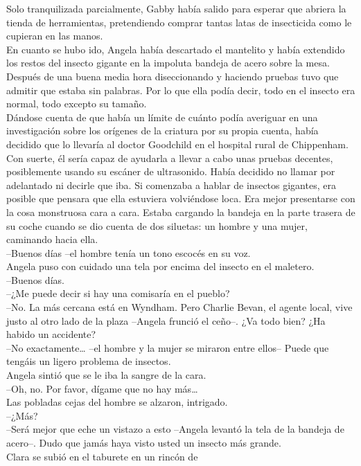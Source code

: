Solo tranquilizada parcialmente, Gabby había salido para esperar que
abriera la tienda de herramientas, pretendiendo comprar tantas latas de
insecticida como le cupieran en las manos.\\
En cuanto se hubo ido, Angela había descartado el mantelito y había
extendido los restos del insecto gigante en la impoluta bandeja de acero
sobre la mesa. Después de una buena media hora diseccionando y haciendo
pruebas tuvo que admitir que estaba sin palabras. Por lo que ella podía
decir, todo en el insecto era normal, todo excepto su tamaño.\\
Dándose cuenta de que había un límite de cuánto podía averiguar en una
investigación sobre los orígenes de la criatura por su propia cuenta,
había decidido que lo llevaría al doctor Goodchild en el hospital rural
de Chippenham. Con suerte, él sería capaz de ayudarla a llevar a cabo
unas pruebas decentes, posiblemente usando su escáner de ultrasonido.
Había decidido no llamar por adelantado ni decirle que iba. Si comenzaba
a hablar de insectos gigantes, era posible que pensara que ella
estuviera volviéndose loca. Era mejor presentarse con la cosa monstruosa
cara a cara. Estaba cargando la bandeja en la parte trasera de su coche
cuando se dio cuenta de dos siluetas: un hombre y una mujer, caminando
hacia ella.\\
--Buenos días --el hombre tenía un tono escocés en su voz.\\
Angela puso con cuidado una tela por encima del insecto en el
maletero.\\
--Buenos días.\\
--¿Me puede decir si hay una comisaría en el pueblo?\\
--No. La más cercana está en Wyndham. Pero Charlie Bevan, el agente
local, vive justo al otro lado de la plaza --Angela frunció el ceño--.
¿Va todo bien? ¿Ha habido un accidente?\\
--No exactamente\ldots{} --el hombre y la mujer se miraron entre ellos--
Puede que tengáis un ligero problema de insectos.\\
Angela sintió que se le iba la sangre de la cara.\\
--Oh, no. Por favor, dígame que no hay más\ldots{}\\
Las pobladas cejas del hombre se alzaron, intrigado.\\
--¿Más?\\
--Será mejor que eche un vistazo a esto --Angela levantó la tela de la
bandeja de acero--. Dudo que jamás haya visto usted un insecto más
grande.\\[2\baselineskip]Clara se subió en el taburete en un rincón de
